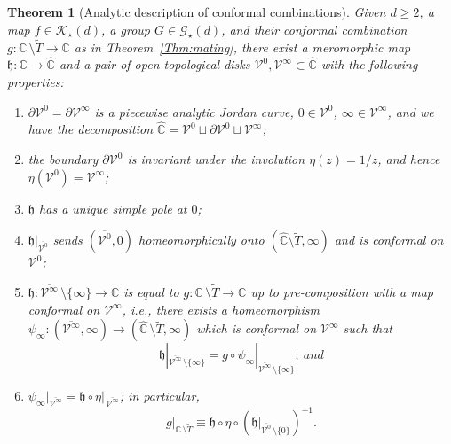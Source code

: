 \documentclass[11pt,a4paper, oneside]{amsart}
\newtheorem{thm}{Theorem}[section]
\theoremstyle{definition}
\theoremstyle{remark}
\numberwithin{equation}{section}
\def\cV{\mathcal {V}}
\renewcommand{\ge}{\geqslant}
\newcommand{\Kstar}{{\mathscr K_\star}}
\newcommand{\Gstar}{\mathscr G_\star}
\newcommand{\C}{\mathbb{C}}
\newcommand{\Cc}{\widehat{{\C}}}
\newcommand{\sm}{\setminus}
\renewcommand{\tilde}{\widetilde}
\begin{document}
\begin{thm}[Analytic description of conformal combinations]
\label{Thm:Analytic}
    Given $d \ge 2$, a map $f \in \Kstar(d)$, a group $G \in \Gstar(d)$, and their conformal combination $g \colon \C \,\sm \tilde T \to \C$ as in Theorem~\ref{Thm:mating}, there exist a meromorphic map $\mathfrak{h} \colon\C\to \Cc$ and a pair of open topological disks $\mathcal V^0, \mathcal V^\infty \subset \Cc$ with the following properties:
    \begin{enumerate}[leftmargin=8mm]
  	     \item $\partial \mathcal V^0 = \partial \mathcal V^\infty$ is a piecewise analytic Jordan curve, $0 \in \mathcal V^0$, $\infty\in\mathcal V^\infty$, and we have the decomposition $\widehat{\C} = \mathcal V^0 \sqcup \partial \mathcal V^0 \sqcup \mathcal V^\infty$;
        \item the boundary $\partial \mathcal V^0$ is invariant under the involution $\eta(z) = 1/z$, and hence $\eta (\mathcal V^0) = \mathcal V^\infty$;
        \item $\mathfrak{h}$ has a unique simple pole at $0$;
        \item $\mathfrak{h}|_{\overline{\cV^0}}$ sends $(\overline{\cV^0},0)$ homeomorphically onto $(\widehat{\C} \sm \tilde T,\infty)$ and is conformal on $\cV^0$;
        \item $\mathfrak{h} \colon {\overline{\cV^\infty}\,\sm \{\infty\}} \to \C$ is equal to $g \colon \C \, \sm \tilde T \to \C$ up to pre-composition with a map conformal on $\cV^\infty$, i.e., there exists a homeomorphism $\psi_{\infty} \colon (\overline{\cV^\infty},\infty) \to (\widehat{\C} \,\sm \tilde T,\infty)$ which is conformal on $\cV^\infty$ such that
    \[
    \mathfrak{h}|_{\overline{\cV^\infty}\,\sm \{\infty\}} = g\circ \psi_\infty|_{\overline{\cV^\infty}\,\sm \{\infty\}};\ and
    \]
    \item  $\psi_\infty|_{\overline{\cV^\infty}} = \mathfrak{h} \circ \eta\vert_{\,\overline{\cV^\infty}}$; in particular, 
    \[
    g\vert_{\C \,\sm \tilde T}\equiv \mathfrak{h}\circ\eta\circ(\mathfrak{h}\vert_{\overline{\cV^0}\,\sm \{0\}})^{-1}.
    \]    
    \end{enumerate}
\end{thm}
\end{document}
